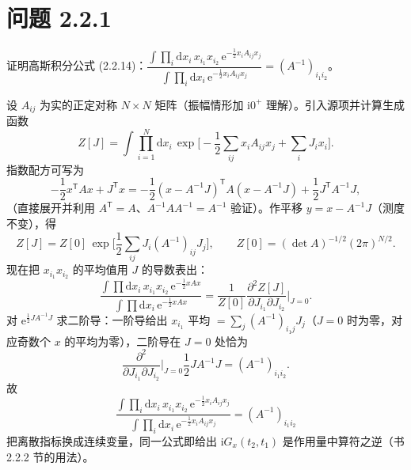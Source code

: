 \section*{问题 2.2.1}
\begin{problem}
证明高斯积分公式 (2.2.14)：$\dfrac{\int\prod_i\mathrm{d}x_i\,x_{i_1}x_{i_2}\,\mathrm{e}^{-\frac12x_iA_{ij}x_j}}{\int\prod_i\mathrm{d}x_i\,\mathrm{e}^{-\frac12x_iA_{ij}x_j}}=(A^{-1})_{i_1i_2}$。
\end{problem}
\solution
设 $A_{ij}$ 为实的正定对称 $N\times N$ 矩阵（振幅情形加 $\mathrm{i}0^+$ 理解）。引入源项并计算生成函数
\begin{equation*}
Z[J]=\int\prod_{i=1}^N\mathrm{d}x_i\,
\exp\Big[-\frac12\sum_{ij}x_iA_{ij}x_j+\sum_iJ_ix_i\Big].
\end{equation*}
指数配方可写为
\begin{equation*}
-\frac12x^{\mathsf T}Ax+J^{\mathsf T}x
=-\frac12(x-A^{-1}J)^{\mathsf T}A(x-A^{-1}J)+\frac12J^{\mathsf T}A^{-1}J,
\end{equation*}
（直接展开并利用 $A^{\mathsf T}=A$、$A^{-1}AA^{-1}=A^{-1}$ 验证）。作平移 $y=x-A^{-1}J$（测度不变），得
\begin{equation*}
Z[J]=Z[0]\,\exp\Big[\frac12\sum_{ij}J_i(A^{-1})_{ij}J_j\Big],
\qquad
Z[0]=(\det A)^{-1/2}(2\pi)^{N/2}.
\end{equation*}
现在把 $x_{i_1}x_{i_2}$ 的平均值用 $J$ 的导数表出：
\begin{equation*}
\frac{\int\prod\mathrm{d}x_i\,x_{i_1}x_{i_2}\,\mathrm{e}^{-\frac12xAx}}
{\int\prod\mathrm{d}x_i\,\mathrm{e}^{-\frac12xAx}}
=\frac1{Z[0]}\frac{\partial^2 Z[J]}{\partial J_{i_1}\partial J_{i_2}}\Big|_{J=0}.
\end{equation*}
对 $\mathrm{e}^{\frac12JA^{-1}J}$ 求二阶导：一阶导给出 $x_{i_1}$ 平均 $=\sum_j(A^{-1})_{i_1j}J_j$（$J=0$ 时为零，对应奇数个 $x$ 的平均为零），二阶导在 $J=0$ 处恰为
\begin{equation*}
\frac{\partial^2}{\partial J_{i_1}\partial J_{i_2}}\Big|_{J=0}\frac12J A^{-1}J=(A^{-1})_{i_1i_2}.
\end{equation*}
故
\begin{equation*}
\boxed{\;\frac{\int\prod_i\mathrm{d}x_i\,x_{i_1}x_{i_2}\,\mathrm{e}^{-\frac12x_iA_{ij}x_j}}
{\int\prod_i\mathrm{d}x_i\,\mathrm{e}^{-\frac12x_iA_{ij}x_j}}=(A^{-1})_{i_1i_2}\;}
\end{equation*}
把离散指标换成连续变量，同一公式即给出 $\mathrm{i}G_x(t_2,t_1)$ 是作用量中算符之逆（书 2.2.2 节的用法）。

